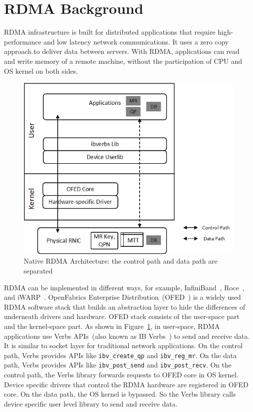 \section{RDMA Background} \label{background}
RDMA infrastructure is built for distributed applications that require high-performance and low latency network communications. It uses a zero copy approach to deliver data between servers. With RDMA, applications can read and write memory of a remote machine, without the participation of CPU and OS kernel on both sides.

\begin{figure}[!ht]
	\centering
	\includegraphics[width=0.8\linewidth]{images/rdma-feat.png}
	\caption{Native RDMA Architecture: the control path and data path are separated}
	\label{fig:rdma-feat}
\end{figure}

RDMA can be implemented in different ways, for example, InfiniBand~\cite{infiniband}, Roce~\cite{roce}, and iWARP~\cite{iwarp}.
OpenFabrics Enterprise Distribution~(OFED~\cite{ofed}) is a widely used RDMA software stack that builds an abstraction layer to hide the differences of underneath drivers and hardware.
OFED stack consists of the user-space part and the kernel-space part.
As shown in Figure~\ref{fig:rdma-feat}, in user-space, RDMA applications use Verbs APIs~(also known as IB Verbs~\cite{verbs}) to send and receive data. It is similar to socket layer for traditional network applications. On the control path, Verbs provides APIs like \texttt{ibv\_create\_qp} and \texttt{ibv\_reg\_mr}. On the data path, Verbs provides APIs like \texttt{ibv\_post\_send} and \texttt{ibv\_post\_recv}. On the control path, the Verbs library forwards requests to OFED core in OS kernel. Device specific drivers that control the RDMA hardware are registered in OFED core. On the data path, the OS kernel is bypassed. So the Verbs library calls device specific user level library to send and receive data.

